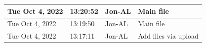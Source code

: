 \documentclass[11pt]{article}
\begin{document}
\begin{center}
\begin{longtable}{|p{2.7cm}|l|p{2cm}|p{8cm}|}
           \hline Tue Oct 4, 2022                            & 13:20:52                           & Jon-AL                                  & Main file                                                                                                                                                                                                                                                                                                  \\
           \hline Tue Oct 4, 2022                            & 13:19:50                           & Jon-AL                                  & Main file                                                                                                                                                                                                                                                                                                  \\
           \hline Tue Oct 4, 2022                            & 13:17:11                           & Jon-AL                                  & Add files via upload                                                                                                                                                                                                                                                                                       \\
        \end{longtable}
    \end{center}

    \pagebreak


%
%
\end{document}
